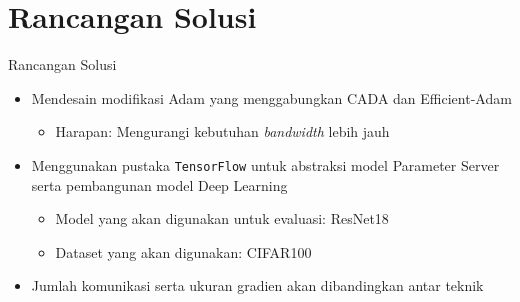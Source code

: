 \documentclass[aspectratio=169]{beamer}
\begin{document}
\section{Rancangan Solusi}
\begin{frame}{Rancangan Solusi}
  \begin{itemize}
    \item Mendesain modifikasi Adam yang menggabungkan CADA \parencite{Chen2021CADA} dan Efficient-Adam \parencite{Chen2022Efficient}
          \begin{itemize}
            \item Harapan: Mengurangi kebutuhan \textit{bandwidth} lebih jauh
          \end{itemize}
    \item Menggunakan pustaka \texttt{TensorFlow} untuk abstraksi model Parameter Server serta pembangunan model Deep Learning
          \begin{itemize}
            \item Model yang akan digunakan untuk evaluasi: ResNet18
            \item Dataset yang akan digunakan: CIFAR100
          \end{itemize}
    \item Jumlah komunikasi serta ukuran gradien akan dibandingkan antar teknik
  \end{itemize}
\end{frame}
\end{document}
